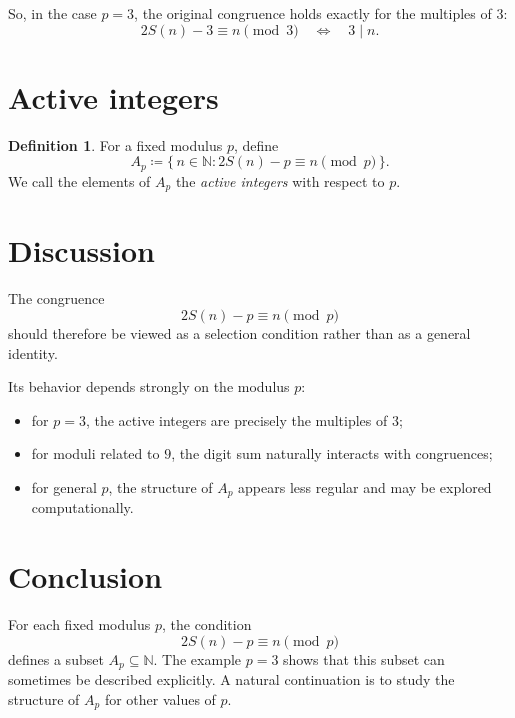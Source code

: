 \documentclass[11pt,a4paper]{article}
\newcommand{\N}{\mathbb{N}}
\theoremstyle{definition}
\newtheorem{definition}{Definition}
\begin{document}
So, in the case \(p = 3\), the original congruence holds exactly for the multiples of \(3\):
\[
2S(n) - 3 \equiv n \pmod{3}
\quad \Longleftrightarrow \quad
3 \mid n.
\]

\section{Active integers}

\begin{definition}
For a fixed modulus \(p\), define
\[
A_p \coloneqq \{\, n \in \N : 2S(n) - p \equiv n \pmod{p} \,\}.
\]
We call the elements of \(A_p\) the \emph{active integers} with respect to \(p\).
\end{definition}

\section{Discussion}

The congruence
\[
2S(n) - p \equiv n \pmod{p}
\]
should therefore be viewed as a selection condition rather than as a general identity.

Its behavior depends strongly on the modulus \(p\):
\begin{itemize}
    \item for \(p = 3\), the active integers are precisely the multiples of \(3\);
    \item for moduli related to \(9\), the digit sum naturally interacts with congruences;
    \item for general \(p\), the structure of \(A_p\) appears less regular and may be explored computationally.
\end{itemize}

\section{Conclusion}

For each fixed modulus \(p\), the condition
\[
2S(n) - p \equiv n \pmod{p}
\]
defines a subset \(A_p \subseteq \N\).
The example \(p=3\) shows that this subset can sometimes be described explicitly.
A natural continuation is to study the structure of \(A_p\) for other values of \(p\).
\end{document}
